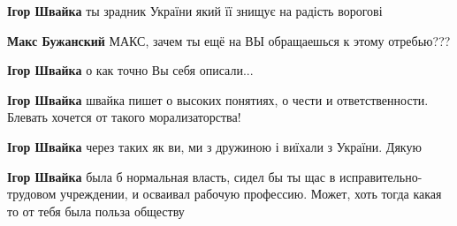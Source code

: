 \begin{itemize}
\begin{itemize}
\textbf{Ігор Швайка} ты зрадник України який її знищує на радість ворогові

 
\textbf{Макс Бужанский} МАКС, зачем ты ещё на ВЫ обращаешься к этому отребью???

 
\textbf{Ігор Швайка} о как точно Вы себя описали...

 
\textbf{Ігор Швайка} швайка пишет о высоких понятиях, о чести и ответственности. Блевать хочется от такого морализаторства!

 
\textbf{Ігор Швайка} через таких як ви, ми з дружиною і виїхали з України. Дякую

 
\textbf{Ігор Швайка} была б нормальная власть, сидел бы ты щас в
исправительно-трудовом учреждении, и осваивал рабочую профессию. Может, хоть
тогда какая то от тебя была польза обществу

 

\end{itemize}
\end{itemize}
